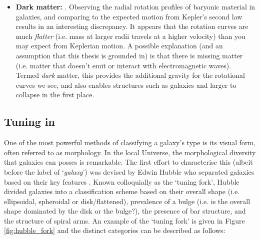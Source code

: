 \begin{itemize}
    \item \textbf{Dark matter:} . Observing the radial rotation profiles of baryonic material in galaxies, and comparing to the expected motion from Kepler's second law results in an interesting discrepancy. It appears that the rotation curves are much \textit{flatter} (i.e. mass at larger radii travels at a higher velocity) than you may expect from Keplerian motion. A possible explanation (and an assumption that this thesis is grounded in) is that there is missing matter (i.e. matter that doesn't emit or interact with electromagnetic waves). Termed \textit{dark} matter, this provides the additional gravity for the rotational curves we see, and also enables structures such as galaxies and larger to collapse in the first place.
\end{itemize}

\subsection{Tuning in}
One of the most powerful methods of classifying a galaxy's type is its visual form, often referred to as morphology. In the local Universe, the morphological diversity that galaxies can posses is remarkable. The first effort to characterise this (albeit before the label of `\textit{galaxy}') was devised by Edwin Hubble who separated galaxies based on their key features \citep{hubble1926, hubble1936}. Known colloquially as the `tuning fork', Hubble divided galaxies into a classification scheme based on their overall shape (i.e. ellipsoidal, spheroidal or disk/flattened), prevalence of a bulge (i.e. is the overall shape dominated by the disk or the bulge?), the presence of bar structure, and the structure of spiral arms. An example of the `tuning fork' is given in Figure \ref{fig:hubble_fork} and the distinct categories can be described as follows:

